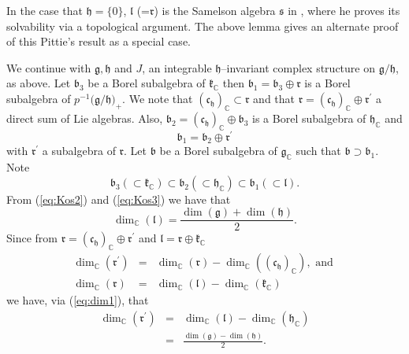 \documentclass{amse-new}
\numberwithin{equation}{section} %
\begin{document}
In the case that $\mathfrak{h}=\{0\}$, $\mathfrak{l}$ (=$\mathfrak{r}$) is the Samelson algebra $\mathfrak{s}$ in \cite{Pittie},
where he proves its solvability via a topological argument.  The above  lemma gives an alternate proof of this Pittie's result as a special case.

We continue with $\mathfrak{g,\mathfrak{h}}$ and $J$, an integrable
$\mathfrak{h}$--invariant complex structure on $\mathfrak{g}%
/\mathfrak{\mathfrak{h}}$, as above. Let $\mathfrak{b}_{3}$ be a Borel subalgebra of
$\mathfrak{k}_{\mathbb{C}}$ then $\mathfrak{b}_{1}=\mathfrak{b}_{3}%
\oplus\mathfrak{r}$ is a Borel subalgebra of $p^{-1}(\mathfrak{g}%
/\mathfrak{\mathfrak{h)}}_{+}$. We note that $\left(  \mathfrak{c}%
_{\mathfrak{h}}\right)  _{\mathbb{C}}\subset\mathfrak{r}$ and that
$\mathfrak{r=}\left(  \mathfrak{c}_{\mathfrak{h}}\right)  _{\mathbb{C}}%
\oplus\mathfrak{r}^{\prime}$ a direct sum of Lie algebras. Also,
$\mathfrak{b}_{2}=\left(  \mathfrak{c}_{\mathfrak{h}}\right)  _{\mathbb{C}%
}\oplus\mathfrak{b}_{3}$ is a Borel subalgebra of $\mathfrak{h}_{\mathbb{C}}$
and
\begin{equation}\label{eq:borelofl}
\mathfrak{b}_{1}\mathfrak{=\mathfrak{b}}_{2}\oplus\mathfrak{r}^{\prime}%
\end{equation}
with $\mathfrak{r}^{\prime}$ a subalgebra of $\mathfrak{r}$. Let
$\mathfrak{b}$ be a Borel subalgebra of $\mathfrak{g}_{\mathbb{C}}$ such that
$\mathfrak{b}\supset\mathfrak{b}_{1}$. Note
$$
\mathfrak{b}_3 (\subset \mathfrak{k}_{\mathbb{C}})\subset \mathfrak{b}_2(\subset \mathfrak{h}_\mathbb{C})\subset \mathfrak{b}_1 (\subset \mathfrak{l}).
$$
From (\ref{eq:Kos2}) and (\ref{eq:Kos3}) we have that
\begin{equation}\label{eq:dim1}
\dim_{\mathbb{C}}(\mathfrak{l})=\frac{\dim (\mathfrak{g})+\dim(\mathfrak{h})}{2}.
\end{equation}
Since from $\mathfrak{r=}\left(  \mathfrak{c}_{\mathfrak{h}}\right)  _{\mathbb{C}}%
\oplus\mathfrak{r}^{\prime}$  and $\mathfrak{l}=\mathfrak{r}\oplus \mathfrak{k}_\mathbb{C}$
\begin{eqnarray*}
\dim_\mathbb{C}(\mathfrak{r}^{\prime})&=&\dim_\mathbb{C}(\mathfrak{r})-
\dim_\mathbb{C}((\mathfrak{c}_\mathfrak{h})_\mathbb{C}), \mbox{ and } \\
\dim_\mathbb{C}(\mathfrak{r})&=&\dim_\mathbb{C}(\mathfrak{l})-\dim_\mathbb{C}(\mathfrak{k}_\mathbb{C})
\end{eqnarray*}
we have,  via (\ref{eq:dim1}), that
\begin{eqnarray}
\dim_\mathbb{C}(\mathfrak{r}^{\prime})&=&\dim_\mathbb{C}(\mathfrak{l})-\dim_{\mathbb{C}}(\mathfrak{h}_\mathbb{C})\nonumber \\
&=&
\frac{\dim (\mathfrak{g})-\dim(\mathfrak{h})}{2}.\label{eq:dim2}
\end{eqnarray}
\end{document}
